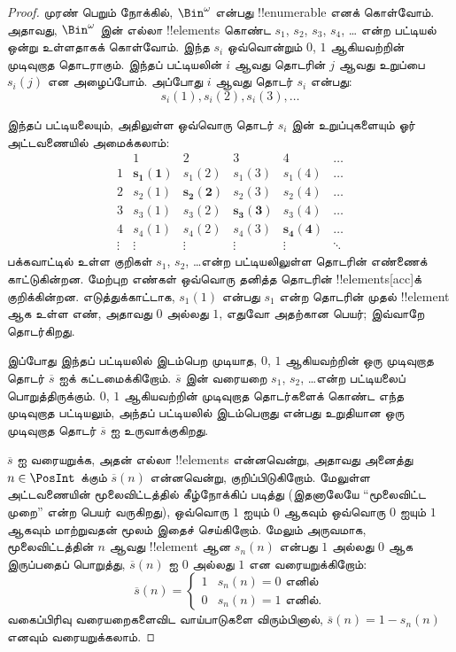 \documentclass[../../../include/open-logic-section]{subfiles}
\begin{document}
\begin{proof}
முரண் பெறும் நோக்கில், $\Bin^\omega$ என்பது !!{enumerable} எனக் கொள்வோம்.
அதாவது, $\Bin^\omega$ இன் எல்லா !!{element}s கொண்ட
$s_{1}$, $s_{2}$, $s_{3}$, $s_{4}$, \dots{} என்ற பட்டியல்
ஒன்று உள்ளதாகக் கொள்வோம்.
இந்த $s_i$ ஒவ்வொன்றும் $0$, $1$ ஆகியவற்றின் முடிவுறாத தொடராகும்.
இந்தப் பட்டியலின் $i$ ஆவது தொடரின் $j$ ஆவது உறுப்பை
$s_i(j)$ என அழைப்போம்.
அப்போது $i$ ஆவது தொடர் $s_i$ என்பது:
\[
s_i(1), s_i(2), s_i(3), \dots
\]

இந்தப் பட்டியலையும், அதிலுள்ள ஒவ்வொரு தொடர் $s_i$ இன் உறுப்புகளையும்
ஓர் அட்டவணையில் அமைக்கலாம்:
\[
\begin{array}{c|c|c|c|c|c}
& 1 & 2 & 3 & 4 & \dots \\\hline
1 & \mathbf{s_{1}(1)} & s_{1}(2) & s_{1}(3) & s_1(4) & \dots \\\hline
2 & s_{2}(1)& \mathbf{s_{2}(2)} & s_2(3) & s_2(4) & \dots \\\hline
3 & s_{3}(1)& s_{3}(2) & \mathbf{s_3(3)} & s_3(4) & \dots \\\hline
4 & s_{4}(1)& s_{4}(2) & s_4(3) & \mathbf{s_4(4)} & \dots \\\hline
\vdots & \vdots & \vdots & \vdots & \vdots & \mathbf{\ddots}
\end{array}
\]
பக்கவாட்டில் உள்ள குறிகள் $s_1$, $s_2$, \dots என்ற பட்டியலிலுள்ள
தொடரின் எண்ணைக் காட்டுகின்றன.
மேற்புற எண்கள் ஒவ்வொரு தனித்த தொடரின் !!{element}s[acc]க் குறிக்கின்றன.
எடுத்துக்காட்டாக, $s_{1}(1)$ என்பது $s_{1}$ என்ற தொடரின்
முதல் !!{element} ஆக உள்ள எண், அதாவது $0$ அல்லது $1$, எதுவோ
அதற்கான பெயர்; இவ்வாறே தொடர்கிறது.

இப்போது இந்தப் பட்டியலில் இடம்பெற முடியாத,
$0$, $1$ ஆகியவற்றின் ஒரு முடிவுறாத தொடர் $\overline{s}$ ஐக்
கட்டமைக்கிறோம். $\overline{s}$ இன் வரையறை
$s_1$, $s_2$, \dots என்ற பட்டியலைப் பொறுத்திருக்கும்.
$0$, $1$ ஆகியவற்றின் முடிவுறாத தொடர்களைக் கொண்ட எந்த முடிவுறாத
பட்டியலும், அந்தப் பட்டியலில் இடம்பெறாது என்பது உறுதியான
ஒரு முடிவுறாத தொடர் $\overline{s}$ ஐ உருவாக்குகிறது.

$\overline{s}$ ஐ வரையறுக்க, அதன் எல்லா !!{element}s என்னவென்று,
அதாவது அனைத்து $n \in \PosInt$ க்கும் $\overline{s}(n)$ என்னவென்று,
குறிப்பிடுகிறோம்.
மேலுள்ள அட்டவணையின் மூலைவிட்டத்தில் கீழ்நோக்கிப் படித்து
(இதனாலேயே “மூலைவிட்ட முறை” என்ற பெயர் வருகிறது),
ஒவ்வொரு $1$ ஐயும் $0$ ஆகவும் ஒவ்வொரு $0$ ஐயும் $1$ ஆகவும்
மாற்றுவதன் மூலம் இதைச் செய்கிறோம்.
மேலும் அருவமாக, மூலைவிட்டத்தின் $n$ ஆவது !!{element} ஆன
$s_n(n)$ என்பது $1$ அல்லது $0$ ஆக இருப்பதைப் பொறுத்து,
$\overline{s}(n)$ ஐ $0$ அல்லது $1$ என வரையறுக்கிறோம்:
\[
\overline{s}(n) =
\begin{cases}
1 & \text{$s_{n}(n) = 0$ எனில்}\\
0 & \text{$s_{n}(n) = 1$ எனில்}.
\end{cases}
\]
வகைப்பிரிவு வரையறைகளைவிட வாய்பாடுகளை விரும்பினால்,
$\overline{s}(n) = 1 - s_n(n)$ எனவும் வரையறுக்கலாம்.


\end{proof}
\end{document}
